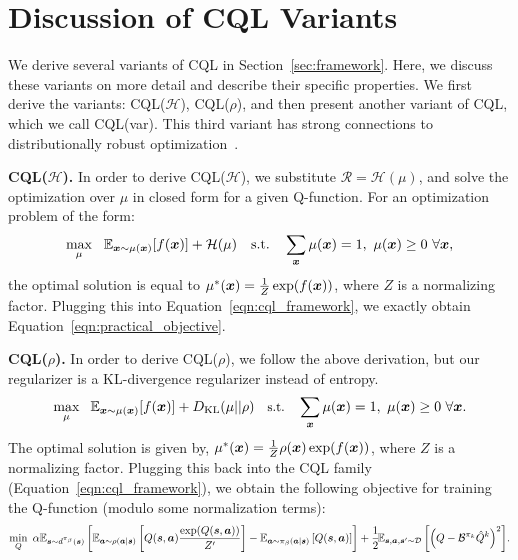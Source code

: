 \section{Discussion of CQL Variants}
\label{app:cql_variants}
We derive several variants of CQL in Section~\ref{sec:framework}. Here, we discuss these variants on more detail and describe their specific properties. We first derive the variants: CQL($\mathcal{H}$), CQL($\rho$), and then present another variant of CQL, which we call CQL(var). This third variant has strong connections to distributionally robust optimization~\citep{namkoong2017variance}.

\textbf{CQL($\mathcal{H}$).} In order to derive CQL($\mathcal{H}$), we substitute $\mathcal{R} = \mathcal{H}(\mu)$, and solve the optimization over $\mu$ in closed form for a given Q-function. For an optimization problem of the form:
\begin{equation*}
    \max_{\mu}~~ \mathbb{E}_{\boldsymbol{x} \sim \mu(\boldsymbol{x})}[f(\boldsymbol{x})] + \mathcal{H}(\mu)~~~ \text{s.t.}~~~ \sum_{\boldsymbol{x}} \mu(\boldsymbol{x}) = 1,~ \mu({\boldsymbol{x}}) \geq 0~ \forall \boldsymbol{x},
\end{equation*}
the optimal solution is equal to $\mu^*(\boldsymbol{x}) = \frac{1}{Z} \exp(f(\boldsymbol{x}))$, where $Z$ is a normalizing factor. Plugging this into Equation~\ref{eqn:cql_framework}, we exactly obtain Equation~\ref{eqn:practical_objective}.

\textbf{CQL($\rho$).} In order to derive CQL($\rho$), we follow the above derivation, but our regularizer is a KL-divergence regularizer instead of entropy.
\begin{equation*}
    \small{\max_{\mu}~~ \mathbb{E}_{\boldsymbol{x}\sim \mu(\boldsymbol{x})}[f(\boldsymbol{x})] + D_{\mathrm{KL}}(\mu || \rho)~~~ \text{s.t.}~~~ \sum_{\boldsymbol{x}} \mu(\boldsymbol{x}) = 1,~ \mu({\boldsymbol{x}}) \geq 0~ \forall \boldsymbol{x}}.
\end{equation*}
The optimal solution is given by, $\mu^*(\boldsymbol{x}) = \frac{1}{Z} \rho(\boldsymbol{x}) \exp(f(\boldsymbol{x}))$, where $Z$ is a normalizing factor. Plugging this back into the CQL family (Equation~\ref{eqn:cql_framework}), we obtain the following objective for training the Q-function (modulo some normalization terms):
\begin{equation}
    \small{\min_{Q}~ \alpha \mathbb{E}_{\boldsymbol{s}\sim d^{\pi_\beta}(\boldsymbol{s})}\left[\mathbb{E}_{\boldsymbol{a} \sim \rho(\boldsymbol{a}|\boldsymbol{s})} \left[Q(\boldsymbol{s}, \boldsymbol{a}) \frac{\exp(Q(\boldsymbol{s}, \boldsymbol{a}))}{Z'}\right] - \mathbb{E}_{\boldsymbol{a} \sim {\pi_\beta}(\boldsymbol{a}|\boldsymbol{s})}\left[Q(\boldsymbol{s}, \boldsymbol{a})\right]\right] + \frac{1}{2}\!\mathbb{E}_{\boldsymbol{s}, \boldsymbol{a}, \boldsymbol{s}' \sim \mathcal{D}}\left[\left(Q - \mathcal{B}^{\pi_k} \hat{Q}^{k} \right)^2 \right]\!.}
    \label{eqn:cql_rho_objective}
\end{equation}

